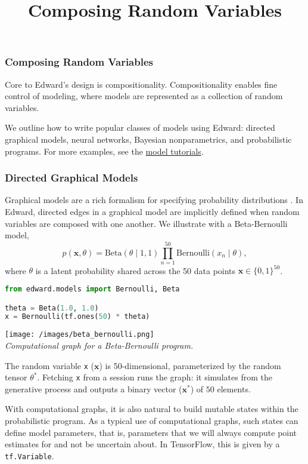 \title{Composing Random Variables}

\subsubsection{Composing Random Variables}

Core to Edward's design is compositionality. Compositionality enables
fine control of modeling, where models are represented as a collection
of random variables.

We outline how to write popular classes of models using Edward:
directed graphical models, neural networks, Bayesian nonparametrics,
and probabilistic programs. For more examples, see the
\href{/tutorials/}{model tutorials}.

\subsubsection{Directed Graphical Models}

Graphical models are a rich formalism for specifying probability
distributions \citep{koller2009probabilistic}.
In Edward, directed edges in a graphical model are implicitly defined
when random variables are composed with one another. We illustrate
with a Beta-Bernoulli model,
\begin{equation*}
p(\mathbf{x}, \theta) =
\text{Beta}(\theta\mid 1, 1)
\prod_{n=1}^{50} \text{Bernoulli}(x_n\mid \theta),
\end{equation*}
where $\theta$ is a latent probability shared across the 50 data
points $\mathbf{x}\in\{0,1\}^{50}$.

\begin{lstlisting}[language=python]
from edward.models import Bernoulli, Beta

theta = Beta(1.0, 1.0)
x = Bernoulli(tf.ones(50) * theta)
\end{lstlisting}

\texttt{[image: /images/beta\_bernoulli.png]} \\
{\small\textit{%
Computational graph for a Beta-Bernoulli program.
}}

The random variable \texttt{x} ($\mathbf{x}$) is 50-dimensional,
parameterized by the random tensor $\theta^*$. Fetching \texttt{x}
from a session runs the graph: it simulates from the generative process
and outputs a binary vector ($\mathbf{x}^*$) of $50$ elements.

With computational graphs, it is also natural to build mutable states
within the probabilistic program. As a typical use of computational
graphs, such states can define model parameters, that is, parameters
that we will always compute point estimates for and not be uncertain
about. In TensorFlow, this is given by a \texttt{tf.Variable}.

